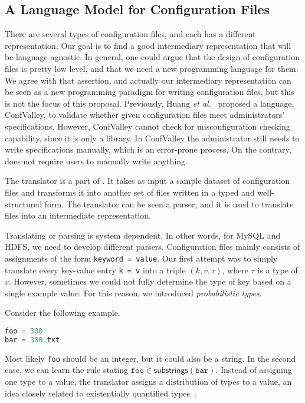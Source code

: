 \subsection{A Language Model for Configuration Files}
\label{sec:lang}

There are several types of configuration 
files, and each has a different representation. Our goal is to find a good 
intermediary representation that will be language-agnostic. In general,
one could argue that the design of configuration files is pretty low 
level, and that we need a new programming language for them. We agree with 
that assertion, and actually our intermediary representation can be seen
as a new programming paradigm for writing configuration files, but this
is not the focus of this proposal. Previously, Huang {\em et al.}~\cite{huang15confvalley} proposed a 
language, ConfValley, to validate 
whether given configuration files meet administrators' specifications. 
However, ConfValley cannot check for misconfiguration checking 
capability, since it is only a library. In ConfValley the administrator 
still needs to write specifications manually, which is an error-prone
process. On the contrary, \app does not require users to manually
write anything.

The translator is a part of \app. It takes as input a sample dataset of configuration files and transforms it into another set of files written in a
typed and well-structured form.
The translator can be seen a parser, and it is
used to translate files into an intermediate representation.

Translating or parsing is system dependent. In other words, for MySQL
and HDFS, we need to develop different parsers.
Configuration files mainly consists of assignments of the form {\tt {keyword = value}}. Our first attempt was to simply
translate every key-value entry {\tt {k = v}} into a triple $(k, v, \tau)$, where $\tau$ is a type of 
$v$. However, sometimes we could not fully determine the type of key 
based on a single example value. For this reason, we introduced {\emph {probabilistic types}}.

Consider the following example.
\begin{lstlisting}[language=C, xleftmargin=.01\textwidth]
foo = 300
bar = 300.txt
\end{lstlisting} 
Most likely {\tt foo} should be an integer, but it could also be a string.
In the second case, we can learn the rule stating 
$ \texttt{foo} \in \textsf{substrings}(\texttt{bar})$. 
Instead of assigning one type to a value, the translator assigns a distribution of types 
to a value, an idea closely related to existentially quantified 
types~\cite{Launchbury93lazyfunctional}. 

